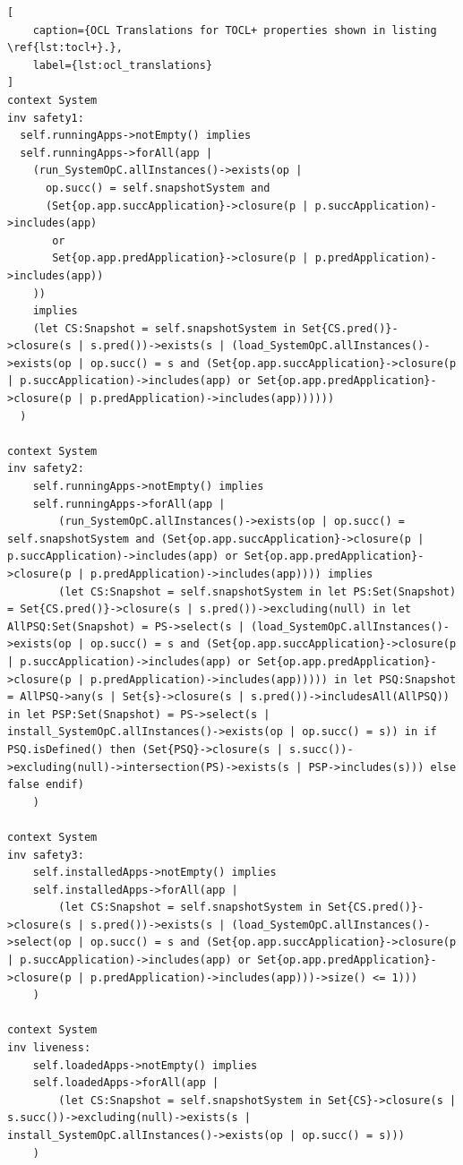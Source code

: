 \begin{lstlisting}[
    caption={OCL Translations for TOCL+ properties shown in listing \ref{lst:tocl+}.},
    label={lst:ocl_translations}
]
context System
inv safety1:
  self.runningApps->notEmpty() implies
  self.runningApps->forAll(app |
    (run_SystemOpC.allInstances()->exists(op | 
      op.succ() = self.snapshotSystem and 
      (Set{op.app.succApplication}->closure(p | p.succApplication)->includes(app) 
       or 
       Set{op.app.predApplication}->closure(p | p.predApplication)->includes(app))
    )) 
    implies
    (let CS:Snapshot = self.snapshotSystem in Set{CS.pred()}->closure(s | s.pred())->exists(s | (load_SystemOpC.allInstances()->exists(op | op.succ() = s and (Set{op.app.succApplication}->closure(p | p.succApplication)->includes(app) or Set{op.app.predApplication}->closure(p | p.predApplication)->includes(app))))))
  )

context System
inv safety2:
    self.runningApps->notEmpty() implies
    self.runningApps->forAll(app |
        (run_SystemOpC.allInstances()->exists(op | op.succ() = self.snapshotSystem and (Set{op.app.succApplication}->closure(p | p.succApplication)->includes(app) or Set{op.app.predApplication}->closure(p | p.predApplication)->includes(app)))) implies
        (let CS:Snapshot = self.snapshotSystem in let PS:Set(Snapshot) = Set{CS.pred()}->closure(s | s.pred())->excluding(null) in let AllPSQ:Set(Snapshot) = PS->select(s | (load_SystemOpC.allInstances()->exists(op | op.succ() = s and (Set{op.app.succApplication}->closure(p | p.succApplication)->includes(app) or Set{op.app.predApplication}->closure(p | p.predApplication)->includes(app))))) in let PSQ:Snapshot = AllPSQ->any(s | Set{s}->closure(s | s.pred())->includesAll(AllPSQ)) in let PSP:Set(Snapshot) = PS->select(s | install_SystemOpC.allInstances()->exists(op | op.succ() = s)) in if PSQ.isDefined() then (Set{PSQ}->closure(s | s.succ())->excluding(null)->intersection(PS)->exists(s | PSP->includes(s))) else false endif)
    )

context System
inv safety3:
    self.installedApps->notEmpty() implies
    self.installedApps->forAll(app |
        (let CS:Snapshot = self.snapshotSystem in Set{CS.pred()}->closure(s | s.pred())->exists(s | (load_SystemOpC.allInstances()->select(op | op.succ() = s and (Set{op.app.succApplication}->closure(p | p.succApplication)->includes(app) or Set{op.app.predApplication}->closure(p | p.predApplication)->includes(app)))->size() <= 1)))
    )

context System
inv liveness:
    self.loadedApps->notEmpty() implies
    self.loadedApps->forAll(app |
        (let CS:Snapshot = self.snapshotSystem in Set{CS}->closure(s | s.succ())->excluding(null)->exists(s | install_SystemOpC.allInstances()->exists(op | op.succ() = s)))
    )


\end{lstlisting}
